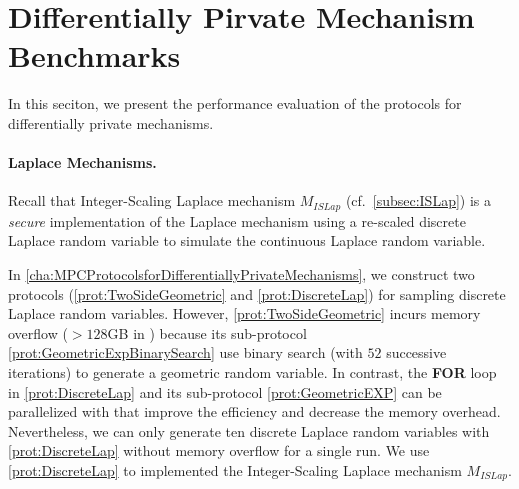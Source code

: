 \section{Differentially Pirvate Mechanism Benchmarks}
\label{sec:DifferentiallyPirvateMechanismBenchmarks}
In this seciton, we present the performance evaluation of the \smpc protocols for differentially private mechanisms.

\paragraph{Laplace Mechanisms.}
Recall that Integer-Scaling Laplace mechanism $M_{ISLap} $ (cf.~\autoref{subsec:ISLap}) is a \textit{secure} implementation of the Laplace mechanism using a re-scaled discrete Laplace random variable to simulate the continuous Laplace random variable.

In \autoref{cha:MPCProtocolsforDifferentiallyPrivateMechanisms}, we construct two \smpc protocols (\autoref{prot:TwoSideGeometric} and \autoref{prot:DiscreteLap}) for sampling discrete Laplace random variables. However, \autoref{prot:TwoSideGeometric} incurs memory overflow ($>128$GB in \twopc) because its sub-protocol \autoref{prot:GeometricExpBinarySearch} use binary search (with $52$ successive iterations) to generate a geometric random variable. In contrast, the \textbf{FOR} loop in \autoref{prot:DiscreteLap} and its sub-protocol \autoref{prot:GeometricEXP} can be parallelized with \simd that improve the efficiency and decrease the memory overhead.
Nevertheless, we can only generate ten discrete Laplace random variables with \autoref{prot:DiscreteLap} without memory overflow for a single run.
We use \autoref{prot:DiscreteLap} to implemented the Integer-Scaling Laplace mechanism $M_{ISLap}$.



